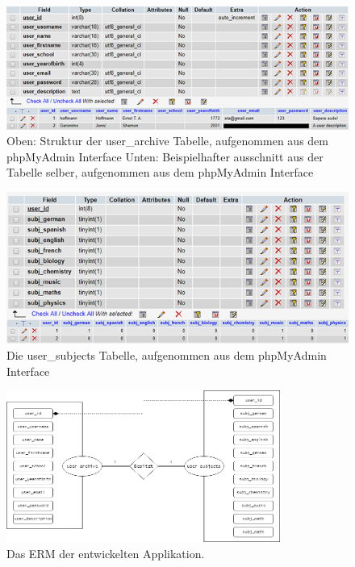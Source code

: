 \documentclass[a4paper,11pt]{report}
\begin{document}
				\begin{figure}
					\begin{center}
						\includegraphics[center]{user_archive.png}
						\caption{Oben: Struktur der user\_archive Tabelle, aufgenommen aus dem phpMyAdmin Interface Unten: Beispielhafter ausschnitt aus der Tabelle selber, aufgenommen aus dem phpMyAdmin Interface}
						\label{user_archive:PNG}
					\end{center}
				\end{figure}
				\begin{figure}
					\begin{center}
						\includegraphics[center]{user_subjects.png}
						\caption{Die user\_subjects Tabelle, aufgenommen aus dem phpMyAdmin Interface}
						\label{user_subjects:PNG}
					\end{center}
				\end{figure}
				\begin{figure}
					\begin{center}
						\includegraphics[width=0.8\textwidth]{ERM-Matura.png}
						\caption{Das ERM der entwickelten Applikation.}
						\label{ERM}
					\end{center}
				\end{figure}
				
\end{document}
